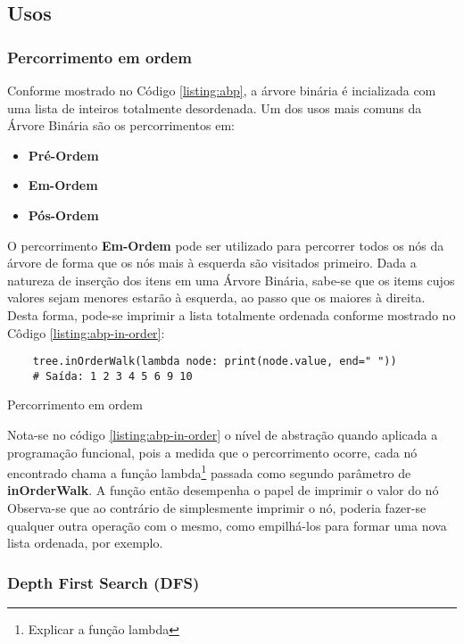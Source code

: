 \subsection{Usos}
\subsubsection{Percorrimento em ordem}
Conforme mostrado no Código \ref{listing:abp}, a árvore binária é incializada com uma lista de inteiros totalmente desordenada.
Um dos usos mais comuns da Árvore Binária são os percorrimentos em:
\begin{itemize}
    \item\textbf{Pré-Ordem}
    \item\textbf{Em-Ordem}
    \item\textbf{Pós-Ordem}
\end{itemize}

O percorrimento \textbf{Em-Ordem} pode ser utilizado para percorrer todos os nós da árvore de forma que os nós mais à esquerda são visitados primeiro. Dada a natureza de inserção dos itens em uma Árvore Binária,
sabe-se que os items cujos valores sejam menores estarão à esquerda, ao passo que os maiores à direita. Desta forma, pode-se imprimir a lista totalmente ordenada conforme mostrado no Côdigo \ref{listing:abp-in-order}:

\begin{listing}[!ht]
    \begin{verbatim}
    tree.inOrderWalk(lambda node: print(node.value, end=" "))
    # Saída: 1 2 3 4 5 6 9 10 
    \end{verbatim}
    \caption{Percorrimento em ordem}
    \label{listing:abp-in-order}
\end{listing}

Nota-se no código \ref{listing:abp-in-order} o nível de abstração quando aplicada a programação funcional, pois a medida que o percorrimento ocorre, cada nó encontrado chama a funçåo lambda\footnote{
    Explicar a função lambda
} passada como segundo parâmetro de \textbf{inOrderWalk}. A função então desempenha o papel de imprimir o valor do nó
Observa-se que ao contrário de simplesmente imprimir o nó, poderia fazer-se qualquer outra operação com o mesmo, como empilhá-los para formar uma nova lista
ordenada, por exemplo.

\subsubsection{Depth First Search (DFS)}

